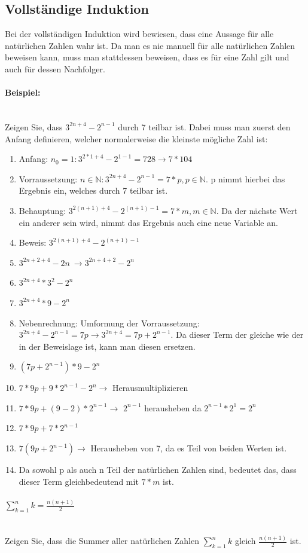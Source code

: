 \documentclass{article}
\newcommand{\paragraphlb}[1]{\paragraph{#1}\mbox{}\\}
\newcommand{\N}{\mathbb{N}}
\begin{document}
	\subsection{Vollständige Induktion}
	Bei der vollständigen Induktion wird bewiesen, dass eine Aussage für alle natürlichen Zahlen wahr ist. Da man es nie manuell für alle natürlichen Zahlen beweisen kann, muss man stattdessen beweisen, dass es für eine Zahl gilt und auch für dessen Nachfolger.
	\paragraphlb{Beispiel:}
	Zeigen Sie, dass $3^{2n+4}-2^{n-1}$ durch 7 teilbar ist. Dabei muss man zuerst den Anfang definieren, welcher normalerweise die kleinste mögliche Zahl ist: \\
	\begin{enumerate}
		\item{Anfang: $n_0=1: 3^{2*1+4}-2^{1-1}=728\to 7*104$}
		\item{Vorraussetzung: $n\in\N: 3^{2n+4}-2^{n-1}=7*p, p\in\N$. p nimmt hierbei das Ergebnis ein, welches durch 7 teilbar ist.}
		\item{Behauptung: $3^{2(n+1)+4}-2^{(n+1)-1} = 7*m, m\in\N$. Da der nächste Wert ein anderer sein wird, nimmt das Ergebnis auch eine neue Variable an.}
		\item{Beweis: $3^{2(n+1)+4}-2^{(n+1)-1}$}
		\item{$3^{2n+2+4}-2{n}\ \to 3^{2n+4+2}-2^n$}
		\item{$3^{2n+4}*3^2-2^n$}
		\item{$3^{2n+4}*9-2^n$}
		\item{Nebenrechnung: Umformung der Vorraussetzung: $3^{2n+4}-2^{n-1} = 7p \to 3^{2n+4} = 7p+2^{n-1}$. Da dieser Term der gleiche wie der in der Beweislage ist, kann man diesen ersetzen.}
		\item{$(7p+2^{n-1})*9-2^n$}
		\item{$7*9p+9*2^{n-1}-2^n \to$ Herausmultiplizieren}
		\item{$7*9p+(9-2)*2^{n-1} \to$ $2^{n-1}$ herausheben da $2^{n-1}*2^1 = 2^n$}
		\item{$7*9p + 7*2^{n-1}$}
		\item{$7(9p+2^{n-1}) \to$ Herausheben von 7, da es Teil von beiden Werten ist.}
		\item{Da sowohl p als auch n Teil der natürlichen Zahlen sind, bedeutet das, dass dieser Term gleichbedeutend mit $7*m$ ist.}
	\end{enumerate}
	\paragraphlb{$\sum^n_{k=1}{k}=\frac{n(n+1)}{2}$}
	Zeigen Sie, dass die Summer aller natürlichen Zahlen $\sum^n_{k=1}{k}$ gleich $\frac{n(n+1)}{2}$ ist. \\
\end{document}
